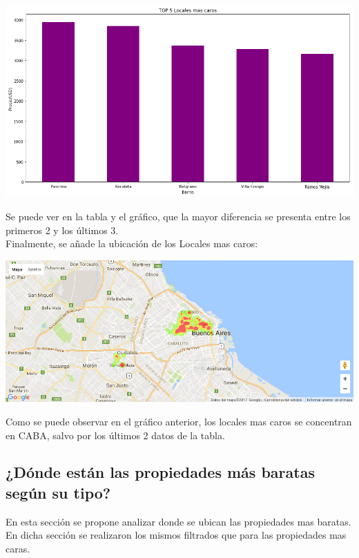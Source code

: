 \documentclass[a4paper, 10pt]{article}
\begin{document}
				\begin{center}
   		    				\includegraphics[width=\textwidth]{images/topLc}
				\end{center}
				
				Se puede ver en la tabla y el gráfico, que la mayor diferencia se presenta entre los primeros 2 y los últimos 3.\\				
				Finalmente, se añade la ubicación de los Locales mas caros:
				
				\begin{center}
   		    				\includegraphics[width=\textwidth]{images/ubicLc}
				\end{center}	
				
				Como se puede observar en el gráfico anterior, los locales mas caros se concentran en CABA, salvo por los últimos 2 datos de la tabla.
				
				
			\subsection{¿Dónde están las propiedades más baratas según su tipo?}
				En esta sección se propone analizar donde se ubican las propiedades mas baratas. \\
				En dicha sección se realizaron los mismos filtrados que para las propiedades mas caras.
				 							
\end{document}
